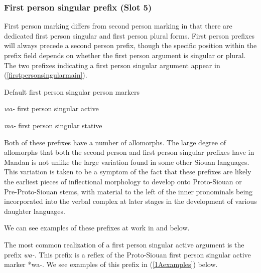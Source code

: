 \subsubsection{First person singular prefix (Slot 5)}\label{SubsubFirstPersonSingular}

First person marking differs from second person marking in that there are dedicated first person singular and first person plural forms.  First person prefixes will always precede a second person prefix, though the specific position within the prefix field depends on whether the first person argument is singular or plural. The two prefixes indicating a first person singular argument appear in (\ref{firstpersonsingularmain}).

\begin{exe}
\item\label{firstpersonsingularmain} Default first person singular person markers

\begin{xlist}
	\item \textit{wa-} first person singular active
	\item \textit{ma-} first person singular stative
\end{xlist}

\end{exe}

Both of these prefixes have a number of allomorphs. The large degree of allomorphs that both the second person and first person singular prefixes have in Mandan is not unlike the large variation found in some other Siouan languages. This variation is taken to be a symptom of the fact that these prefixes are likely the earliest pieces of inflectional morphology to develop onto Proto-Siouan or Pre-Proto-Siouan stems, with material to the left of the inner pronominals being incorporated into the verbal complex at later stages in the development of various daughter languages.

We can see examples of these prefixes at work in  and  below.

\label{Para1A}

The most common realization of a first person singular active argument is the prefix \textit{wa-}. This prefix is a reflex of the Proto-Siouan first person singular active marker *wa-. We see examples of this prefix in (\ref{1Aexamples}) below.

